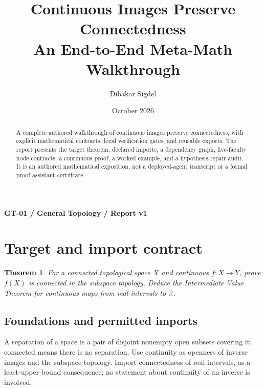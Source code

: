 \documentclass[preprint,12pt,aps,pra,showkeys,amsmath,amssymb,superscriptaddress,floatfix]{revtex4-2}
\newtheorem{theorem}{Theorem}[section]
\theoremstyle{definition}
\theoremstyle{remark}
\begin{document}
\title{Continuous Images Preserve Connectedness\\[4pt]\large An End-to-End Meta-Math Walkthrough}

\author{Dibakar Sigdel}


\date{October 2026}

\begin{abstract}

A complete authored walkthrough of continuous images preserve
connectedness, with explicit mathematical contracts, local verification
gates, and reusable exports. The report presents the target theorem,
declared imports, a dependency graph, five-faculty node contracts, a
continuous proof, a worked example, and a hypothesis-repair audit. It is
an authored mathematical exposition, not a deployed-agent transcript or
a formal proof-assistant certificate.

\end{abstract}\maketitle\linespread{1.12}\selectfont

\noindent\textbf{GT-01 / General Topology / Report v1}

\section{Target and import contract}

\begin{theorem}

For a connected topological space \(X\) and continuous \(f:X\to Y\),
prove \(f(X)\) is connected in the subspace topology. Deduce the
Intermediate Value Theorem for continuous maps from real intervals to
\(\mathbb R\).

\end{theorem}

\subsection{Foundations and permitted imports}

A separation of a space is a pair of disjoint nonempty open subsets
covering it; connected means there is no separation. Use continuity as
openness of inverse images and the subspace topology. Import
connectedness of real intervals, as a least-upper-bound consequence; no
statement about continuity of an inverse is involved.
\end{document}
